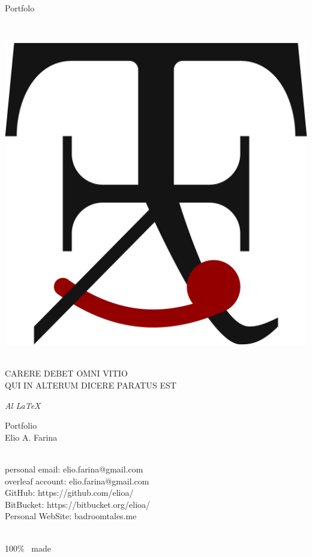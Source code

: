 

    \null
    \vfill
    \begin{center}
        {\fontsize{50pt}{20pt}\selectfont\color{COLV}Portfol\blackcolouri o}\\
        \strut\\
    \end{center}
    \vfill
    \begin{center}
    \includegraphics[width=0.3\linewidth]{./TikZimages/logoofficial.pdf}\\
    {\small\trjnfamily \strut\\ CARERE DEBET OMNI VITIO\\ QUI IN ALTERUM DICERE PARATUS EST}
    \end{center}

    \clearpage
    \begin{flushright}
        \textit{\huge Al \LaTeX}
    \end{flushright}
        \vfill
    \begin{center}
    \end{center}
        \vfill
    \begin{flushright}
        \huge
        Portfolio\\
        Elio A. Farina\\
        \LARGE
        \strut\\
        personal email: elio.farina@gmail.com\\
        overleaf account: elio.farina@gmail.com\\
        GitHub: https://github.com/elioa/\\
        BitBucket: https://bitbucket.org/elioa/\\
        Personal WebSite: badroomtales.me\\
        \strut\\
        100\% \LaTeXe\ made
    \end{flushright}

